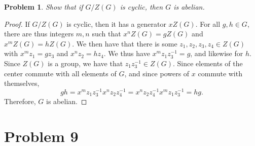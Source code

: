 \documentclass[11pt, letterpaper]{article}
\theoremstyle{plain}
\newtheorem{problem}{Problem}[section]
\begin{document}
\begin{problem}\label{8}
	Show that if $G/Z(G)$ is cyclic, then $G$ is abelian.
\end{problem}
\begin{proof}
	If $G/Z(G)$ is cyclic, then it has a generator $xZ(G)$. For all $g,h\in G$, there are thus integers $m,n$ such that $x^nZ(G)=gZ(G)$ and $x^mZ(G)=hZ(G)$. We then have that there is some $z_1,z_2,z_3,z_4\in Z(G)$ with $x^mz_1=gz_3$ and $x^nz_2=hz_4$. We thus have $x^mz_1z_3^{-1} =g$, and likewise for $h$. Since $Z(G)$ is a group, we have that $z_1z_3^{-1} \in Z(G)$. Since elements of the center commute with all elements of $G$, and since powers of $x$ commute with themselves,
	\[
		gh=x^mz_1z_3^{-1} x^nz_2z_4^{-1} =x^nz_2z_4^{-1} x^mz_1z_3^{-1}=hg
	.\]
	Therefore, $G$ is abelian.
\end{proof}

\section{Problem 9}
\end{document}
